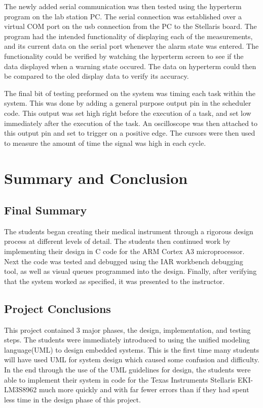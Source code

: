 \documentclass[12pt]{article} %
\begin{document}
    The newly added serial communication was then tested using the hyperterm program on the lab station PC. The serial connection was established over a virtual COM port on the usb connection from the PC to the Stellaris board. The program had the intended functionality of displaying each of the measurements, and its current data on the serial port whenever the alarm state was entered. The functionality could be verified by watching the hyperterm screen to see if the data displayed when a warning state occured. The data on hyperterm could then be compared to the oled display data to verify its accuracy. 
    
    

    The final bit of testing preformed on the system was timing each task within
    the system. This was done by adding a general purpose output pin in the
    scheduler code. This output was set high right before the execution of a task,
    and set low immediately after the execution of the task. An oscilloscope was
    then attached to this output pin and set to trigger on a positive edge. The
    cursors were then used to measure the amount of time the signal was high in
    each cycle.


    \section{Summary and Conclusion}

    \subsection{Final Summary} The students began creating their medical instrument
    through a rigorous design process at different levels of detail. The students
    then continued work by implementing their design in C code for the ARM Cortex
    A3 microprocessor. Next the code was tested and debugged using the IAR
    workbench debugging tool, as well as visual queues programmed into the design.
    Finally, after verifying that the system worked as specified, it was presented
    to the instructor.

    \subsection{Project Conclusions} This project contained 3 major phases, the
    design, implementation, and testing steps. The students were immediately
    introduced to using the unified modeling language(UML) to design embedded
    systems. This is the first time many students will have used UML for system
    design which caused some confusion and difficulty. In the end through the use
    of the UML guidelines for design, the students were able to implement their
    system in code for the Texas Instruments Stellaris EKI-LM3S8962 much more
    quickly and with far fewer errors than if they had spent less time in the
    design phase of this project. 
\end{document}

